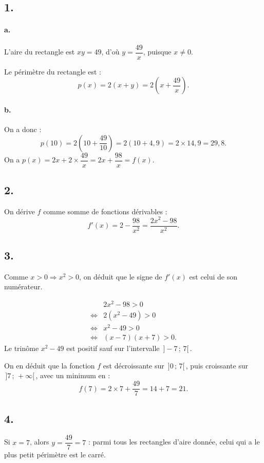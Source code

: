 \subsection*{1.}

\paragraph{a.} L'aire du rectangle est \( x y = 49 \), d'où \( y = \dfrac{49}{x} \), puisque \( x \neq 0 \).

Le périmètre du rectangle est :
\[
p(x) = 2(x + y) = 2\left(x + \dfrac{49}{x}\right).
\]

\paragraph{b.} On a donc :
\[
p(10) = 2\left(10 + \dfrac{49}{10}\right) = 2(10 + 4{,}9) = 2 \times 14{,}9 = 29{,}8.
\]
On a \(p(x) = 2x + 2 \times \dfrac{49}{x} = 2x + \dfrac{98}{x} = f(x)\).

\subsection*{2.}

On dérive \(f\) comme somme de fonctions dérivables :
\[
f'(x) = 2 - \dfrac{98}{x^2} = \dfrac{2x^2 - 98}{x^2}.
\]

\subsection*{3.}

Comme \(x > 0 \Rightarrow x^2 > 0\), on déduit que le signe de \(f'(x)\) est celui de son numérateur.

\begin{align*}
&2x^2 - 98 > 0 \\
\iff &2(x^2 - 49) > 0 \\
\iff &x^2 - 49 > 0 \\
\iff &(x - 7)(x + 7) > 0.
\end{align*}
Le trinôme \(x^2 - 49\) est positif sauf sur l'intervalle \(\,] - 7 \,;\, 7 [\,\).

On en déduit que la fonction \(f\) est décroissante sur \(\,] 0 \,;\, 7 [\,\), puis croissante sur \(\,] 7 \,;\, +\infty [\,\), avec un minimum en :
\[
f(7) = 2 \times 7 + \dfrac{49}{7} = 14 + 7 = 21.
\]

\begin{center}
\end{center}

\subsection*{4.}

Si \(x = 7\), alors \(y = \dfrac{49}{7} = 7\) : parmi tous les rectangles d'aire donnée, celui qui a le plus petit périmètre est le carré.
